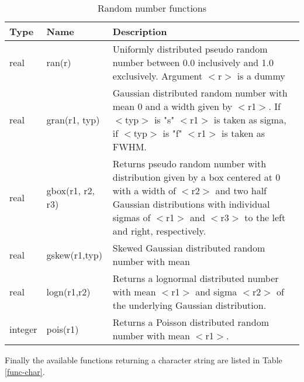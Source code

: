 \begin{table}[!tbh]
\centering
\begin{tabularx}{\textwidth}{|p{12mm}|p{30mm}|X|}
  \hline
  {\bf Type} & {\bf Name} & {\bf Description} \\
  \hline\hline
  real & ran(r) &         Uniformly distributed pseudo random number
                          between 0.0 inclusively and 1.0 exclusively.
                          Argument $<$r$>$ is a dummy\\
  real & gran(r1, typ) &   Gaussian distributed random number with mean
                          0 and a width given by $<$r1$>$. If $<$typ$>$
                          is "s" $<$r1$>$ is taken as sigma, if
                          $<$typ$>$ is "f" $<$r1$>$ is taken as
                          FWHM. \\
  real & gbox(r1, r2, r3) & Returns pseudo random number with
                          distribution given by a box centered
                          at 0 with a width of $<$r2$>$ and two half
                          Gaussian distributions with individual
                          sigmas of $<$r1$>$ and $<$r3$>$ to the left
                          and right, respectively. \\
  real & gskew(r1,typ) &  Skewed Gaussian distributed random number 
                          with mean
                          \\
  real & logn(r1,r2)      & Returns a lognormal distributed number
                          with mean $<$r1$>$ and sigma $<$r2$>$ of
                          the underlying
                          Gaussian distribution.\\
  integer & pois(r1)      & Returns a Poisson distributed random
                          number with mean $<$r1$>$.\\
  \hline
\end{tabularx}
\caption{\label{func-ran}Random number functions}
\end{table}

Finally the available functions returning a character string are
listed in Table \ref{func-char}.


